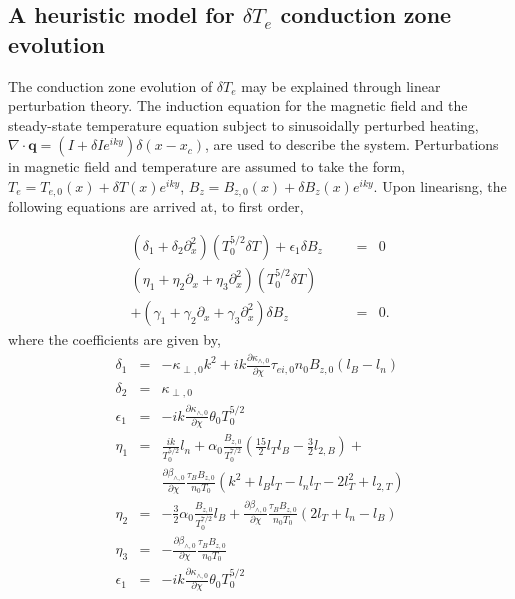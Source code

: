 \documentclass[aip,reprint]{revtex4-1}
\begin{document}
\subsection{A heuristic model for $\delta T_e$ conduction zone evolution}
\label{sec:eigenmodes}
The  conduction zone evolution of $\delta T_e$ may be explained through linear perturbation theory. The induction equation for the magnetic field and the steady-state temperature equation subject to sinusoidally perturbed heating, $\nabla \cdot \mathbf{q} = (I + \delta Ie^{iky})\delta (x-x_c)$, are used to describe the system. Perturbations in magnetic field and temperature are assumed to take the form, $T_{e} = T_{e,0}(x) + \delta T(x)e^{iky}$, $B_{z} = B_{z,0}(x) + \delta B_z(x)e^{iky}$. Upon linearisng, the following equations  are arrived at, to first order,

\begin{eqnarray}
(\delta_1 + \delta_2 \partial_x^2 )(T_0^{5/2}\delta T) + \epsilon_1 \delta B_{z} &=& 0\label{eq:linear-analysis-Te}\\
(\eta_1 + \eta_2 \partial_x + \eta_3 \partial^2_x)(T_0^{5/2}\delta T) \qquad&& \nonumber\\
+(\gamma_1 +\gamma_2 \partial_x   + \gamma_3 \partial^2_x)\delta B_z&=& 0.\label{eq:linear-analysis-Bz}
\label{eq:linear-analysis}
\end{eqnarray}
where the coefficients are given by,
\begin{eqnarray}
\delta_1 &=& -\kappa_{\perp,0}k^2 + i k \frac{\partial \kappa_{\wedge,0}}{\partial \chi} \tau_{ei,0} n_0 B_{z,0}\left(l_B - l_n \right) \\
\delta_2 &=& \kappa_{\perp,0} \nonumber\\
\epsilon_1 &=& -i k \frac{\partial \kappa_{\wedge,0}}{\partial \chi} \theta_0 T_0^{5/2} \nonumber\\
\eta_1 &=& \frac{i k }{T_0^{5/2}} l_n +\alpha_0
\frac{ B_{z,0}}{T_0^{7/2}}\left(\frac{15}{2} l_T l_B - \frac{3}{2} l_{2,B}\right) + \nonumber\\
&&\frac{\partial \beta_{\wedge,0}}{\partial \chi}\frac{\tau_B B_{z,0}}{n_0 T_0}\left(k^2 + l_B l_T - l_n l_T - 2l_T^2 + l_{2,T} \right) \nonumber\\
\eta_2 &=& - \frac{3}{2}\alpha_0\frac{B_{z,0}}{T_0^{7/2}}l_B + \frac{\partial \beta_{\wedge,0}}{\partial \chi}\frac{\tau_B B_{z,0}}{n_0 T_0} (2l_T + l_n - l_B) \nonumber\\
\eta_3 &=& - \frac{\partial \beta_{\wedge,0}}{\partial \chi} \frac{\tau_B B_{z,0}}{n_0 T_0} \nonumber\\
\epsilon_1 &=& -i k \frac{\partial \kappa_{\wedge,0}}{\partial \chi} \theta_0 T_0^{5/2} 
\end{eqnarray}
\end{document}
